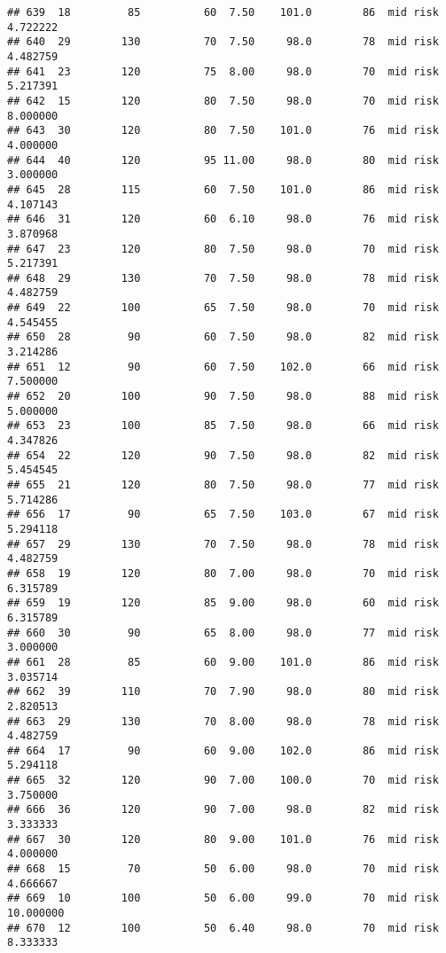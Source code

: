 \documentclass[
  ignorenonframetext,
]{beamer}
\begin{document}
\begin{frame}[fragile]
\begin{verbatim}
## 639  18         85          60  7.50    101.0        86  mid risk      4.722222
## 640  29        130          70  7.50     98.0        78  mid risk      4.482759
## 641  23        120          75  8.00     98.0        70  mid risk      5.217391
## 642  15        120          80  7.50     98.0        70  mid risk      8.000000
## 643  30        120          80  7.50    101.0        76  mid risk      4.000000
## 644  40        120          95 11.00     98.0        80  mid risk      3.000000
## 645  28        115          60  7.50    101.0        86  mid risk      4.107143
## 646  31        120          60  6.10     98.0        76  mid risk      3.870968
## 647  23        120          80  7.50     98.0        70  mid risk      5.217391
## 648  29        130          70  7.50     98.0        78  mid risk      4.482759
## 649  22        100          65  7.50     98.0        70  mid risk      4.545455
## 650  28         90          60  7.50     98.0        82  mid risk      3.214286
## 651  12         90          60  7.50    102.0        66  mid risk      7.500000
## 652  20        100          90  7.50     98.0        88  mid risk      5.000000
## 653  23        100          85  7.50     98.0        66  mid risk      4.347826
## 654  22        120          90  7.50     98.0        82  mid risk      5.454545
## 655  21        120          80  7.50     98.0        77  mid risk      5.714286
## 656  17         90          65  7.50    103.0        67  mid risk      5.294118
## 657  29        130          70  7.50     98.0        78  mid risk      4.482759
## 658  19        120          80  7.00     98.0        70  mid risk      6.315789
## 659  19        120          85  9.00     98.0        60  mid risk      6.315789
## 660  30         90          65  8.00     98.0        77  mid risk      3.000000
## 661  28         85          60  9.00    101.0        86  mid risk      3.035714
## 662  39        110          70  7.90     98.0        80  mid risk      2.820513
## 663  29        130          70  8.00     98.0        78  mid risk      4.482759
## 664  17         90          60  9.00    102.0        86  mid risk      5.294118
## 665  32        120          90  7.00    100.0        70  mid risk      3.750000
## 666  36        120          90  7.00     98.0        82  mid risk      3.333333
## 667  30        120          80  9.00    101.0        76  mid risk      4.000000
## 668  15         70          50  6.00     98.0        70  mid risk      4.666667
## 669  10        100          50  6.00     99.0        70  mid risk     10.000000
## 670  12        100          50  6.40     98.0        70  mid risk      8.333333

\end{verbatim}
\end{frame}
\end{document}
